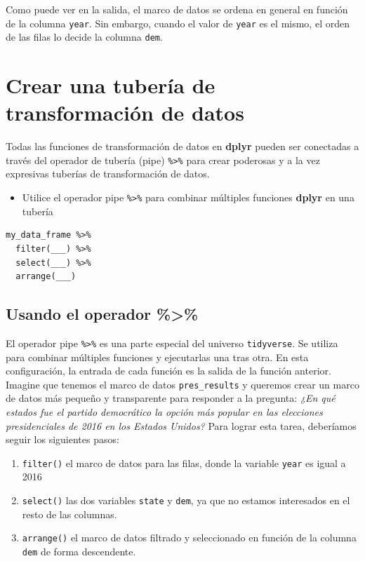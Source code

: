 \documentclass[
]{book}
\providecommand{\tightlist}{%
  \setlength{\itemsep}{0pt}\setlength{\parskip}{0pt}}
\begin{document}
Como puede ver en la salida, el marco de datos se ordena en general en función de la columna \texttt{year}. Sin embargo, cuando el valor de \texttt{year} es el mismo, el orden de las filas lo decide la columna \texttt{dem}.

\hypertarget{crear-una-tuberuxeda-de-transformaciuxf3n-de-datos}{%
\section{Crear una tubería de transformación de datos}\label{crear-una-tuberuxeda-de-transformaciuxf3n-de-datos}}

Todas las funciones de transformación de datos en \textbf{dplyr} pueden ser conectadas a través del operador de tubería (pipe) \texttt{\%\textgreater{}\%} para crear poderosas y a la vez expresivas tuberías de transformación de datos.

\begin{itemize}
\tightlist
\item
  Utilice el operador pipe \texttt{\%\textgreater{}\%} para combinar múltiples funciones \textbf{dplyr} en una tubería
\end{itemize}

\begin{verbatim}
my_data_frame %>%
  filter(___) %>%
  select(___) %>%
  arrange(___)
\end{verbatim}

\hypertarget{usando-el-operador}{%
\subsection{Usando el operador \%\textgreater\%}\label{usando-el-operador}}

El operador pipe \texttt{\%\textgreater{}\%} es una parte especial del universo \texttt{tidyverse}. Se utiliza para combinar múltiples funciones y ejecutarlas una tras otra. En esta configuración, la entrada de cada función es la salida de la función anterior. Imagine que tenemos el marco de datos \texttt{pres\_results} y queremos crear un marco de datos más pequeño y transparente para responder a la pregunta: \emph{¿En qué estados fue el partido democrático la opción más popular en las elecciones presidenciales de 2016 en los Estados Unidos?} Para lograr esta tarea, deberíamos seguir los siguientes pasos:

\begin{enumerate}
\def\labelenumi{\arabic{enumi}.}
\tightlist
\item
  \texttt{filter()} el marco de datos para las filas, donde la variable \texttt{year} es igual a 2016
\item
  \texttt{select()} las dos variables \texttt{state} y \texttt{dem}, ya que no estamos interesados en el resto de las columnas.
\item
  \texttt{arrange()} el marco de datos filtrado y seleccionado en función de la columna \texttt{dem} de forma descendente.
\end{enumerate}
\end{document}
